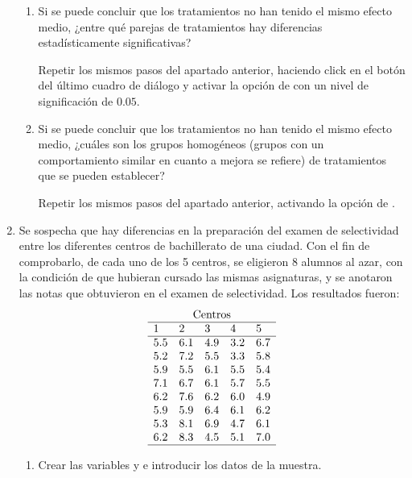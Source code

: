 \begin{enumerate}[leftmargin=*]
\begin{enumerate}
\item Si se puede concluir que los tratamientos no han tenido el mismo efecto medio, ¿entre qué parejas de tratamientos hay diferencias
estadísticamente significativas?
\begin{indicacion}
Repetir los mismos pasos del apartado anterior, haciendo click en el botón
 del último cuadro de diálogo y activar la opción de  con un nivel de
significación de $0.05$.
\end{indicacion}

\item Si se puede concluir que los tratamientos no han tenido el mismo efecto medio, ¿cuáles son los grupos homogéneos (grupos con un
comportamiento similar en cuanto a mejora se refiere) de tratamientos que se pueden establecer?
\begin{indicacion}
Repetir los mismos pasos del apartado anterior, activando la opción de .
\end{indicacion}
\end{enumerate}

\item Se sospecha que hay diferencias en la preparación del examen de selectividad entre los diferentes centros de bachillerato de una
ciudad. Con el fin de comprobarlo, de cada uno de los 5 centros, se eligieron 8 alumnos al azar, con la condición de que hubieran cursado
las mismas asignaturas, y se anotaron las notas que obtuvieron en el examen de selectividad. Los resultados fueron:
\[
\begin{array}{lllll}
\multicolumn{5}{c}{\text{Centros}} \\
\hline
1 & 2 & 3 & 4 & 5 \\
\hline
5.5 & 6.1 & 4.9 & 3.2 & 6.7 \\
5.2 & 7.2 & 5.5 & 3.3 & 5.8 \\
5.9 & 5.5 & 6.1 & 5.5 & 5.4 \\
7.1 & 6.7 & 6.1 & 5.7 & 5.5 \\
6.2 & 7.6 & 6.2 & 6.0 & 4.9 \\
5.9 & 5.9 & 6.4 & 6.1 & 6.2 \\
5.3 & 8.1 & 6.9 & 4.7 & 6.1 \\
6.2 & 8.3 & 4.5 & 5.1 & 7.0 \\
\hline
\end{array}
\]

\begin{enumerate}
\item Crear las variables  y  e introducir los datos de la muestra.


\end{enumerate}
\end{enumerate}
